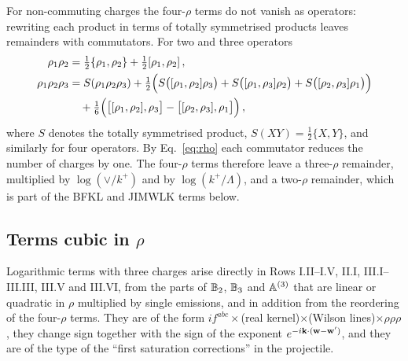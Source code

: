 For non-commuting charges the four-$\rho$ terms do not vanish as operators: rewriting each product in terms of totally symmetrised products leaves remainders with commutators. For two and three operators
\begin{align}\label{eq:symmetrise}
\rho_1\rho_2&=\tfrac12\{\rho_1,\rho_2\}+\tfrac12[\rho_1,\rho_2]\,,\notag\\
\rho_1\rho_2\rho_3&=S(\rho_1\rho_2\rho_3)+\tfrac12\Big(S\big([\rho_1,\rho_2]\rho_3\big)+S\big([\rho_1,\rho_3]\rho_2\big)+S\big([\rho_2,\rho_3]\rho_1\big)\Big)\notag\\&\quad+\tfrac16\Big(\big[[\rho_1,\rho_2],\rho_3\big]-\big[[\rho_2,\rho_3],\rho_1\big]\Big)\,,
\end{align}
where $S$ denotes the totally symmetrised product, $S(XY)=\frac12\{X,Y\}$, and similarly for four operators. By Eq.~\eqref{eq:rho} each commutator reduces the number of charges by one. The four-$\rho$ terms therefore leave a three-$\rho$ remainder, multiplied by $\log(\vee/k^+)$ and by $\log(k^+/\Lambda)$, and a two-$\rho$ remainder, which is part of the BFKL and JIMWLK terms below.

\subsection{Terms cubic in \texorpdfstring{$\rho$}{rho}}\label{sec:threerho}

Logarithmic terms with three charges arise directly in Rows I.II--I.V, II.I, III.I--III.III, III.V and III.VI, from the parts of $\mathbb{B}_2$, $\mathbb{B}_3$ and $\mathbb{A}^{(3)}$ that are linear or quadratic in $\rho$ multiplied by single emissions, and in addition from the reordering of the four-$\rho$ terms. They are of the form $if^{abc}\times$(real kernel)$\times$(Wilson lines)$\times\rho\rho\rho$, they change sign together with the sign of the exponent $e^{-i\mathbf{k}\cdot(\mathbf{w}-\mathbf{w}')}$, and they are of the type of the ``first saturation corrections'' in the projectile.

